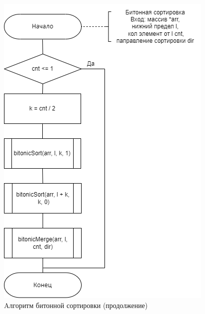 \begin{figure}[h]
	\begin{center}
		\includegraphics[scale=0.7]{img/bitonic_sort_2.png}
	\end{center}
	\captionsetup{justification=centering}
	\caption{Aлгоритм битонной сортировки (продолжение)}
	\label{img:bitonic_sort_2}
\end{figure}
\clearpage
